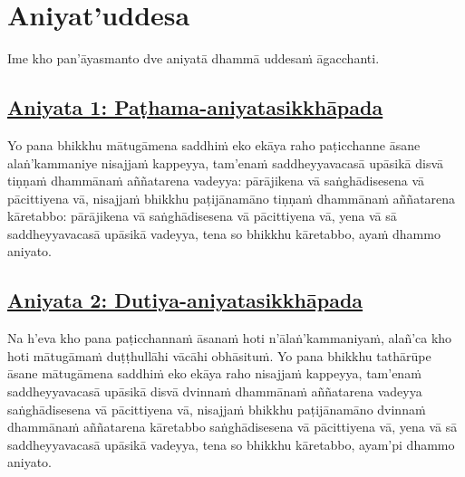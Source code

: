 
\section{Aniyat'uddesa}
\label{aniy}

\begin{intro}
	Ime kho pan'āyasmanto dve aniyatā dhammā uddesaṁ āgacchanti.
\end{intro}

\subsection*{\hyperref[unc1]{Aniyata 1: Paṭhama-aniyatasikkhāpada}}
\label{aniy1}

Yo pana bhikkhu mātugāmena saddhiṁ eko ekāya raho paṭicchanne āsane alaṅ'kammaniye\makeatletter\hyperlink{endnote114-appendix}\makeatother{} nisajjaṁ kappeyya, tam'enaṁ saddheyyavacasā upāsikā disvā tiṇṇaṁ dhammānaṁ aññatarena vadeyya: pārājikena vā saṅghādisesena vā pācittiyena vā, nisajjaṁ bhikkhu paṭijānamāno tiṇṇaṁ dhammānaṁ aññatarena kāretabbo: pārājikena vā saṅghādisesena vā pācittiyena vā, yena vā sā saddheyyavacasā upāsikā vadeyya, tena so bhikkhu kāretabbo, ayaṁ dhammo aniyato.



\subsection*{\hyperref[unc2]{Aniyata 2: Dutiya-aniyatasikkhāpada}}
\label{aniy2}

Na h'eva kho pana paṭicchannaṁ āsanaṁ hoti n'ālaṅ'kammaniyaṁ,\makeatletter\hyperlink{endnote115-appendix}\makeatother{} alañ'ca kho hoti mātugāmaṁ duṭṭhullāhi vācāhi obhāsituṁ. Yo pana bhikkhu tathārūpe āsane mātugāmena saddhiṁ eko ekāya raho nisajjaṁ kappeyya, tam'enaṁ saddheyyavacasā upāsikā disvā dvinnaṁ dhammānaṁ aññatarena vadeyya saṅghādisesena vā pācittiyena vā, nisajjaṁ bhikkhu paṭijānamāno dvinnaṁ dhammānaṁ aññatarena kāretabbo saṅghādisesena vā pācittiyena vā, yena vā sā saddheyyavacasā upāsikā vadeyya, tena so bhikkhu kāretabbo, ayam'pi dhammo aniyato.



